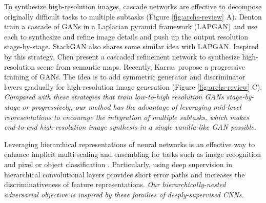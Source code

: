 \documentclass[10pt,twocolumn,letterpaper]{article}
\begin{document}
To synthesize high-resolution images, cascade networks are effective to decompose originally difficult tasks to multiple subtasks (Figure \ref{fig:archs-review} A).
Denton \etal \cite{denton2015deep} train a cascade of GANs in a Laplacian pyramid framework (LAPGAN) and use each to synthesize and refine image details and push up the output resolution stage-by-stage. StackGAN also shares some similar idea with LAPGAN. Inspired by this strategy, Chen \etal \cite{chen2017photographic} present a cascaded refinement network to synthesize high-resolution scene from semantic maps. 
Recently, Karras \etal \cite{Karras2017progressive} propose a progressive training of GANs. The idea is to add symmetric generator and discriminator layers gradually for high-resolution image generation (Figure \ref{fig:archs-review} C). \textit{Compared with these strategies that train low-to-high resolution GANs stage-by-stage or progressively, our method has the advantage of leveraging mid-level representations to encourage the integration of multiple subtasks, which makes end-to-end high-resolution image synthesis in a single vanilla-like GAN possible.}


Leveraging hierarchical representations of neural networks is an effective way to enhance implicit multi-scaling and ensembling for tasks such as image recognition \cite{lee2015deeply} and pixel or object classification \cite{xie2015holistically,cai2016unified,long2015fully}. Particularly, using deep supervision \cite{lee2015deeply} in hierarchical convolutional layers provides short error paths and increases the discriminativeness of feature representations. 
\textit{Our hierarchically-nested adversarial objective is inspired by these families of deeply-supervised CNNs. }

%
%
\end{document}

